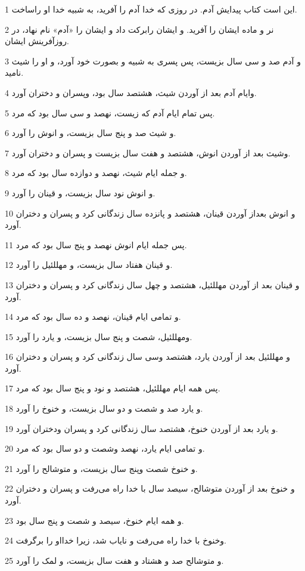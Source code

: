\par 1 این است کتاب پیدایش آدم. در روزی که خدا آدم را آفرید، به شبیه خدا او راساخت.
\par 2 نر و ماده ایشان را آفرید. و ایشان رابرکت داد و ایشان را «آدم» نام نهاد، در روزآفرینش ایشان.
\par 3 و آدم صد و سی سال بزیست، پس پسری به شبیه و بصورت خود آورد، و او را شیث نامید.
\par 4 وایام آدم بعد از آوردن شیث، هشتصد سال بود، وپسران و دختران آورد.
\par 5 پس تمام ایام آدم که زیست، نهصد و سی سال بود که مرد.
\par 6 و شیث صد و پنج سال بزیست، و انوش را آورد.
\par 7 وشیث بعد از آوردن انوش، هشتصد و هفت سال بزیست و پسران و دختران آورد.
\par 8 و جمله ایام شیث، نهصد و دوازده سال بود که مرد.
\par 9 و انوش نود سال بزیست، و قینان را آورد.
\par 10 و انوش بعداز آوردن قینان، هشتصد و پانزده سال زندگانی کرد و پسران و دختران آورد.
\par 11 پس جمله ایام انوش نهصد و پنج سال بود که مرد.
\par 12 و قینان هفتاد سال بزیست، و مهللئیل را آورد.
\par 13 و قینان بعد از آوردن مهللئیل، هشتصد و چهل سال زندگانی کرد و پسران و دختران آورد.
\par 14 و تمامی ایام قینان، نهصد و ده سال بود که مرد.
\par 15 ومهللئیل، شصت و پنج سال بزیست، و یارد را آورد.
\par 16 و مهللئیل بعد از آوردن یارد، هشتصد وسی سال زندگانی کرد و پسران و دختران آورد.
\par 17 پس همه ایام مهللئیل، هشتصد و نود و پنج سال بود که مرد.
\par 18 و یارد صد و شصت و دو سال بزیست، و خنوخ را آورد.
\par 19 و یارد بعد از آوردن خنوخ، هشتصد سال زندگانی کرد و پسران ودختران آورد.
\par 20 و تمامی ایام یارد، نهصد وشصت و دو سال بود که مرد.
\par 21 و خنوخ شصت وپنج سال بزیست، و متوشالح را آورد.
\par 22 و خنوخ بعد از آوردن متوشالح، سیصد سال با خدا راه می‌رفت و پسران و دختران آورد.
\par 23 و همه ایام خنوخ، سیصد و شصت و پنج سال بود.
\par 24 وخنوخ با خدا راه می‌رفت و نایاب شد، زیرا خدااو را برگرفت.
\par 25 و متوشالح صد و هشتاد و هفت سال بزیست، و لمک را آورد.

